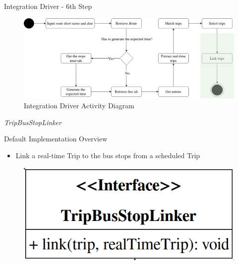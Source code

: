 \documentclass[xcolor=dvipsnames,table]{beamer}
\begin{document}
\begin{frame}{Integration Driver - 6th Step}
        \begin{figure}[H]
                \centering
                \includegraphics[width = \textwidth]{images/integrationDriverAD(6th_step).png}
                \caption{Integration Driver Activity Diagram}
        \end{figure}
\end{frame}
\begin{frame}{\textit{TripBusStopLinker}}
        \begin{block}{Default Implementation Overview}
                \begin{itemize}
                        \item Link a real-time Trip to the bus stops from a scheduled Trip
                \end{itemize}
        \end{block}
        \begin{figure}[H]
                \centering
                \includegraphics[scale=0.25]{images/TripBusStopLinker.png}
        \end{figure}
\end{frame}
\end{document}
